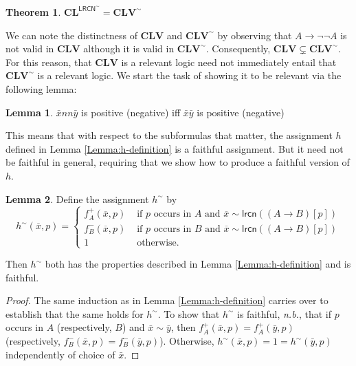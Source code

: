 \documentclass{amsart}
\newtheorem{theorem}{Theorem}
\theoremstyle{definition}
\newtheorem{lemma}{Lemma}
\newcommand{\lrcn}{\mathsf{lrcn}}
\newcommand{\LRCN}{\mathsf{LRCN}}
\begin{document}
\begin{theorem}
    $\mathbf{CL}^{\LRCN^{\sim}}=\mathbf{CLV}^{\sim}$
\end{theorem}

We can note the distinctness of $\mathbf{CLV}$ and $\mathbf{CLV}^{\sim}$ by observing that $A\rightarrow\neg\neg A$ is not valid in $\mathbf{CLV}$ although it is valid in $\mathbf{CLV}^{\sim}$. Consequently, $\mathbf{CLV}\subsetneq\mathbf{CLV}^{\sim}$. For this reason, that $\mathbf{CLV}$ is a relevant logic need not immediately entail that $\mathbf{CLV}^{\sim}$ is a relevant logic. We start the task of showing it to be relevant via the following lemma:

\begin{lemma}
    $\bar{x}nn\bar{y}$ is positive (negative) iff $\bar{x}\bar{y}$ is positive (negative)
\end{lemma}

This means that with respect to the subformulas that matter, the assignment $h$ defined in Lemma \ref{Lemma:h-definition} is a faithful assignment. But it need not be faithful in general, requiring that we show how to produce a faithful version of $h$. 

\begin{lemma}\label{Lemma:h-sim-definition}
   Define the assignment $h^{\sim}$ by
    \[
        h^{\sim}(\overline{x},p)=\left\{
        \begin{array}{rl}
            f^+_A(\overline{x}, p) & \text{ if } p \text{ occurs in $A$ and $\overline{x}\sim\lrcn((A\to B)[p])$} \\
            f^-_B(\overline{x}, p) & \text{ if } p \text{ occurs in $B$ and $\overline{x}\sim\lrcn((A\to B)[p])$} \\
            1 & \text{ otherwise}.
        \end{array}\right.
    \]

   \noindent Then $h^{\sim}$ both has the properties described in Lemma \ref{Lemma:h-definition} and is faithful.
\end{lemma}

\begin{proof}
    The same induction as in Lemma \ref{Lemma:h-definition} carries over to establish that the same holds for $h^{\sim}$. To show that $h^{\sim}$ is faithful, \emph{n.b.}, that if $p$ occurs in $A$ (respectively, $B$) and $\bar{x}\sim\bar{y}$, then $f^{+}_{A}(\bar{x},p)=f^{+}_{A}(\bar{y},p)$ (respectively, $f^{-}_{B}(\bar{x},p)=f^{-}_{B}(\bar{y},p)$). Otherwise, $h^{\sim}(\bar{x},p)=1=h^{\sim}(\bar{y},p)$ independently of choice of $\bar{x}$.
\end{proof}
\end{document}
